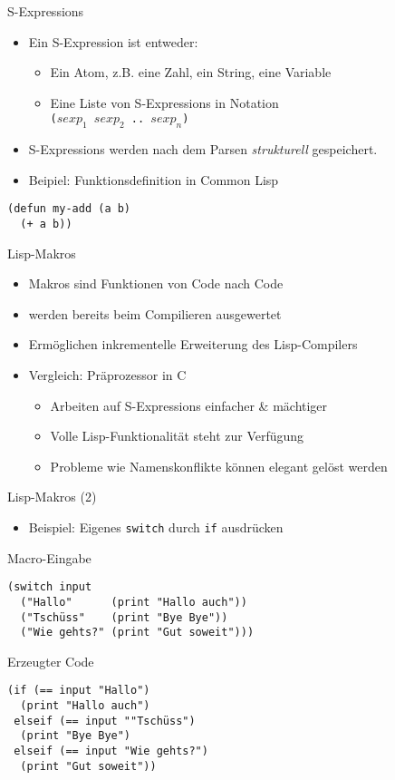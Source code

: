 \documentclass{beamer}
\newcommand{\pfeil}{\item[$\Rightarrow$]}
\begin{document}
\begin{frame}[fragile]{S-Expressions}
  \begin{itemize}
  \item Ein S-Expression ist entweder:
    \begin{itemize}
    \item Ein Atom, z.B. eine Zahl, ein String, eine Variable
    \item Eine Liste von S-Expressions in Notation \\ \texttt{($sexp_1$ $sexp_2$ .. $sexp_n$)}
    \end{itemize}
  \item S-Expressions werden nach dem Parsen \textit{strukturell} gespeichert.
  \item Beipiel: Funktionsdefinition in Common Lisp
  \end{itemize}
\begin{verbatim}
(defun my-add (a b)
  (+ a b))
\end{verbatim}
\end{frame}

\begin{frame}{Lisp-Makros}
  \begin{itemize}
  \item Makros sind Funktionen von Code nach Code
  \item werden bereits beim Compilieren ausgewertet
  \item Ermöglichen inkrementelle Erweiterung des Lisp-Compilers
  \item Vergleich: Präprozessor in C
    \begin{itemize}
    \item Arbeiten auf S-Expressions einfacher \& mächtiger
    \item Volle Lisp-Funktionalität steht zur Verfügung
    \pfeil Probleme wie Namenskonflikte können elegant gelöst werden
    \end{itemize}
  \end{itemize}
\end{frame}

\begin{frame}[t, fragile]{Lisp-Makros (2)}
  \begin{itemize}
  \item Beispiel: Eigenes \texttt{switch} durch \texttt{if} ausdrücken
  \end{itemize}
  \begin{block}{Macro-Eingabe}
\begin{verbatim}
(switch input
  ("Hallo"      (print "Hallo auch"))
  ("Tschüss"    (print "Bye Bye"))
  ("Wie gehts?" (print "Gut soweit")))
\end{verbatim}
  \end{block}
  \begin{block}{Erzeugter Code}
\begin{verbatim}
(if (== input "Hallo")
  (print "Hallo auch")
 elseif (== input ""Tschüss") 
  (print "Bye Bye")
 elseif (== input "Wie gehts?")
  (print "Gut soweit"))
\end{verbatim}
  \end{block}
\end{frame}
\end{document}
